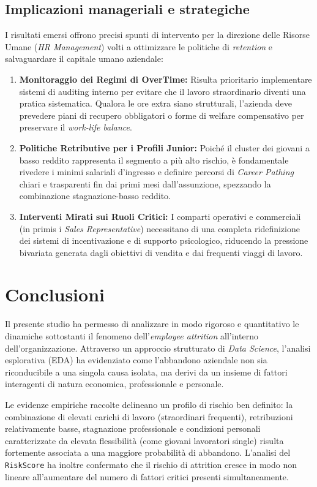\documentclass[11pt,a4paper]{article}
\begin{document}
\subsection{Implicazioni manageriali e strategiche}
I risultati emersi offrono precisi spunti di intervento per la direzione delle Risorse Umane (\textit{HR Management}) volti a ottimizzare le politiche di \textit{retention} e salvaguardare il capitale umano aziendale:
\begin{enumerate}
    \item \textbf{Monitoraggio dei Regimi di OverTime:} Risulta prioritario implementare sistemi di auditing interno per evitare che il lavoro straordinario diventi una pratica sistematica. Qualora le ore extra siano strutturali, l'azienda deve prevedere piani di recupero obbligatori o forme di welfare compensativo per preservare il \textit{work-life balance}.
    \item \textbf{Politiche Retributive per i Profili Junior:} Poiché il cluster dei giovani a basso reddito rappresenta il segmento a più alto rischio, è fondamentale rivedere i minimi salariali d'ingresso e definire percorsi di \textit{Career Pathing} chiari e trasparenti fin dai primi mesi dall'assunzione, spezzando la combinazione stagnazione-basso reddito.
    \item \textbf{Interventi Mirati sui Ruoli Critici:} I comparti operativi e commerciali (in primis i \textit{Sales Representative}) necessitano di una completa ridefinizione dei sistemi di incentivazione e di supporto psicologico, riducendo la pressione bivariata generata dagli obiettivi di vendita e dai frequenti viaggi di lavoro.
\end{enumerate}

\section{Conclusioni}

Il presente studio ha permesso di analizzare in modo rigoroso e quantitativo le dinamiche sottostanti il fenomeno dell’\textit{employee attrition} all’interno dell’organizzazione. Attraverso un approccio strutturato di \textit{Data Science}, l’analisi esplorativa (EDA) ha evidenziato come l’abbandono aziendale non sia riconducibile a una singola causa isolata, ma derivi da un insieme di fattori interagenti di natura economica, professionale e personale.

Le evidenze empiriche raccolte delineano un profilo di rischio ben definito: la combinazione di elevati carichi di lavoro (straordinari frequenti), retribuzioni relativamente basse, stagnazione professionale e condizioni personali caratterizzate da elevata flessibilità (come giovani lavoratori single) risulta fortemente associata a una maggiore probabilità di abbandono. L’analisi del \texttt{RiskScore} ha inoltre confermato che il rischio di attrition cresce in modo non lineare all’aumentare del numero di fattori critici presenti simultaneamente.
\end{document}
